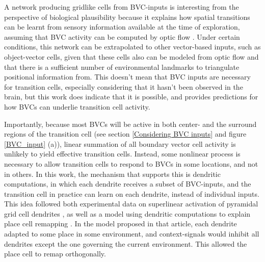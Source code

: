 \documentclass{article}
\begin{document}
    A network producing gridlike cells from BVC-inputs is interesting from the perspective of biological plausibility because it explains how spatial transitions can be learnt from sensory information available at the time of exploration, assuming that BVC activity can be computed by optic flow \parencite{Raudies2012}. Under certain conditions, this network can be extrapolated to other vector-based inputs, such as object-vector cells, given that these cells also can be modeled from optic flow and that there is a sufficient number of environmental landmarks to triangulate positional information from. This doesn't mean that BVC inputs are necessary for transition cells, especially considering that it hasn't been observed in the brain, but this work does indicate that it is possible, and provides predictions for how BVCs can underlie transition cell activity.

    Importantly, because most BVCs will be active in both center- and the surround regions of the transition cell (see section \ref{Considering BVC inputs} and figure \ref{BVC_input} (a)), linear summation of all boundary vector cell activity is unlikely to yield effective transition cells. Instead, some nonlinear process is necessary to allow transition cells to respond to BVCs in some locations, and not in others. In this work, the mechanism that supports this is dendritic computations, in which each dendrite receives a subset of BVC-inputs, and the transition cell in practice can learn on each dendrite, instead of individual inputs. This idea followed both experimental data on superlinear activation of pyramidal grid cell dendrites \parencite{Schmidt-Hieber2017}, as well as a model using dendritic computations to explain place cell remapping \parencite{Alabi2022}. In the model proposed in that article, each dendrite adapted to some place in some environment, and context-signals would inhibit all dendrites except the one governing the current environment. This allowed the place cell to remap orthogonally.
\end{document}
